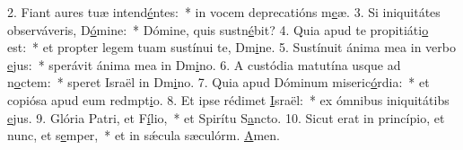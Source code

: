 2. Fiant aures tuæ intend\uline{é}ntes:~* in vocem deprecatións m\uline{e}æ.
3. Si iniquitátes observáveris, D\uline{ó}mine:~* Dómine, quis sustn\uline{é}bit?
4. Quia apud te propitiáti\uline{o} est:~* et propter legem tuam sustínui te, Dm\uline{i}ne.
5. Sustínuit ánima mea in verbo \uline{e}jus:~* sperávit ánima mea in Dm\uline{i}no.
6. A custódia matutína usque ad n\uline{o}ctem:~* speret Israël in Dm\uline{i}no.
7. Quia apud Dóminum miseric\uline{ó}rdia:~* et copiósa apud eum redmpt\uline{i}o.
8. Et ipse rédimet \uline{I}sraël:~* ex ómnibus iniquitátibs \uline{e}jus.
9. Glória Patri, et F\uline{í}lio,~* et Spirítu S\uline{a}ncto.
10. Sicut erat in princípio, et nunc, et s\uline{e}mper,~* et in sǽcula sæculórm. \uline{A}men.
